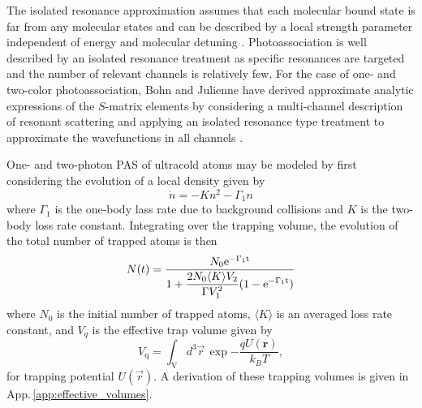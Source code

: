 The isolated resonance approximation assumes that each molecular bound state is far from any molecular states and can be described by a local strength parameter independent of energy and molecular detuning \cite{Bohn1999, Nicholson2015a}.
Photoassociation is well described by an isolated resonance treatment as specific resonances are targeted and the number of relevant channels is relatively few.
For the case of one- and two-color photoassociation, Bohn and Julienne have derived approximate analytic expressions of the $S$-matrix elements by considering a multi-channel description of resonant scattering and applying an isolated resonance type treatment to approximate the wavefunctions in all channels \cite{Bohn1999, Bohn1996, Julienne2006}.

One- and two-photon PAS of ultracold atoms may be modeled by first considering the evolution of a local density given by
\begin{equation}
	\dot{n} = - K n^2 - \Gamma_1 n
\end{equation}
where $\Gamma_1$ is the one-body lass rate due to background collisions and $K$ is the two-body loss rate constant.
Integrating over the trapping volume, the evolution of the total number of trapped atoms is then
\begin{equation}\label{eq:number}
   N(t)= \frac{N_0 \rm{e}^{-\Gamma_1 t}}
   		{\displaystyle 1 + \frac{2 N_0 \langle K \rangle V_2}{\Gamma V_1^2}(1-\rm{e}^{-\Gamma_1 t}) }
\end{equation}
where $N_0$ is the initial number of trapped atoms, $\langle K \rangle$ is an averaged loss rate constant, and $V_q$ is the effective trap volume given by
\begin{equation}\label{eq:effectivevolumes}
	V_{\text{q}}=\int_{\mathrm{V}} d^3\vec{r} \, \exp{-\frac{qU(\mathbf{r})}{k_{B}T}},
\end{equation}
for trapping potential $U(\vec{r})$.
A derivation of these trapping volumes is given in App.\,\ref{app:effective_volumes}.

